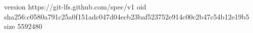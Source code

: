 version https://git-lfs.github.com/spec/v1
oid sha256:c0580a791c25a0f151adc047d04ecb23baf523752e914c00c2b47c54b12e19b5
size 5592480
